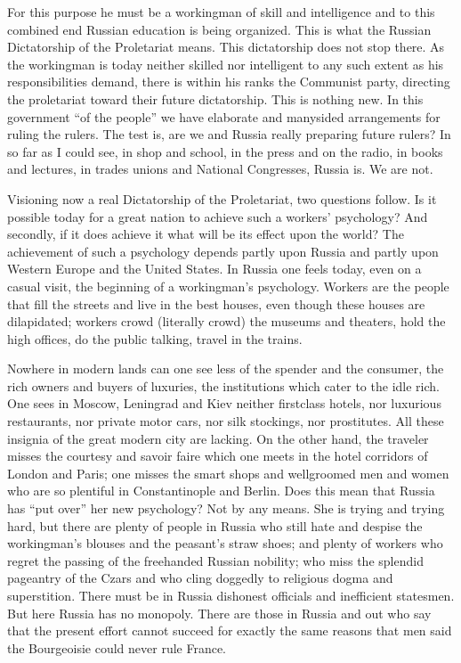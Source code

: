 \documentclass[letterpaper,10pt,english]{jupyterBook}
\begin{document}
\sphinxAtStartPar
For this purpose he must be a workingman of skill and intelligence and to this combined end Russian education is being organized. This is what the Russian Dictatorship of the Proletariat means. This dictatorship does not stop there. As the workingman is today neither skilled nor intelligent to any such extent as his responsibilities demand, there is within his ranks the Communist party, directing the proletariat toward their future dictatorship. This is nothing new. In this government “of the people” we have elaborate and many\sphinxhyphen{}sided arrangements for ruling the rulers. The test is, are we and Russia really preparing future rulers? In so far as I could see, in shop and school, in the press and on the radio, in books and lectures, in trades unions and National Congresses, Russia is. We are not.

\sphinxAtStartPar
Visioning now a real Dictatorship of the Proletariat, two questions follow. Is it possible today for a great nation to achieve such a workers’ psychology? And secondly, if it does achieve it what will be its effect upon the world? The achievement of such a psychology depends partly upon Russia and partly upon Western Europe and the United States. In Russia one feels today, even on a casual visit, the beginning of a workingman’s psychology. Workers are the people that fill the streets and live in the best houses, even though these houses are dilapidated; workers crowd (literally crowd) the museums and theaters, hold the high offices, do the public talking, travel in the trains.

\sphinxAtStartPar
Nowhere in modern lands can one see less of the spender and the consumer, the rich owners and buyers of luxuries, the institutions which cater to the idle rich. One sees in Moscow, Leningrad and Kiev neither first\sphinxhyphen{}class hotels, nor luxurious restaurants, nor private motor cars, nor silk stockings, nor prostitutes. All these insignia of the great modern city are lacking. On the other hand, the traveler misses the courtesy and savoir faire which one meets in the hotel corridors of London and Paris; one misses the smart shops and well\sphinxhyphen{}groomed men and women who are so plentiful in Constantinople and Berlin. Does this mean that Russia has “put over” her new psychology? Not by any means. She is trying and trying hard, but there are plenty of people in Russia who still hate and despise the workingman’s blouses and the peasant’s straw shoes; and plenty of workers who regret the passing of the free\sphinxhyphen{}handed Russian nobility; who miss the splendid pageantry of the Czars and who cling doggedly to religious dogma and superstition. There must be in Russia dishonest officials and inefficient statesmen. But here Russia has no monopoly. There are those in Russia and out who say that the present effort cannot succeed for exactly the same reasons that men said the Bourgeoisie could never rule France.
\end{document}
